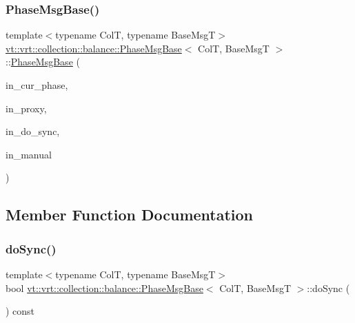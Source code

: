 \subsubsection{\texorpdfstring{Phase\+Msg\+Base()}{PhaseMsgBase()}\hspace{0.1cm}{\footnotesize\ttfamily [2/2]}}
{\footnotesize\ttfamily template$<$typename ColT, typename Base\+MsgT$>$ \\
\hyperlink{structvt_1_1vrt_1_1collection_1_1balance_1_1_phase_msg_base}{vt\+::vrt\+::collection\+::balance\+::\+Phase\+Msg\+Base}$<$ ColT, Base\+MsgT $>$\+::\hyperlink{structvt_1_1vrt_1_1collection_1_1balance_1_1_phase_msg_base}{Phase\+Msg\+Base} (\begin{DoxyParamCaption}\item[{\hyperlink{namespacevt_a46ce6733d5cdbd735d561b7b4029f6d7}{Phase\+Type} const}]{in\+\_\+cur\+\_\+phase,  }\item[{\hyperlink{structvt_1_1vrt_1_1collection_1_1balance_1_1_phase_msg_base_a21c9d10c5a8d1386f4e0a1bfa04f482f}{Proxy\+Type} const}]{in\+\_\+proxy,  }\item[{bool}]{in\+\_\+do\+\_\+sync,  }\item[{bool}]{in\+\_\+manual }\end{DoxyParamCaption})\hspace{0.3cm}{\ttfamily [inline]}}



\subsection{Member Function Documentation}
\mbox{\label{structvt_1_1vrt_1_1collection_1_1balance_1_1_phase_msg_base_aaf899d4257e3333b7080b3ddc5f77847}} 
\subsubsection{\texorpdfstring{do\+Sync()}{doSync()}}
{\footnotesize\ttfamily template$<$typename ColT, typename Base\+MsgT$>$ \\
bool \hyperlink{structvt_1_1vrt_1_1collection_1_1balance_1_1_phase_msg_base}{vt\+::vrt\+::collection\+::balance\+::\+Phase\+Msg\+Base}$<$ ColT, Base\+MsgT $>$\+::do\+Sync (\begin{DoxyParamCaption}{ }\end{DoxyParamCaption}) const\hspace{0.3cm}{\ttfamily [inline]}}

